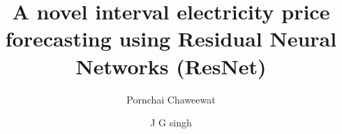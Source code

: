 \documentclass[review]{elsarticle}
\begin{document}
  \begin{frontmatter}

    \title{A novel interval electricity price forecasting using Residual Neural Networks (ResNet)}

    \author{Pornchai Chaweewat}
    \author{J G singh}

    \address{Department of Energy, Environmental and Climate Change, School of Environmental, Resource and Development, Asian Institute of Thechnology, Thailand}



\end{frontmatter}
\end{document}
